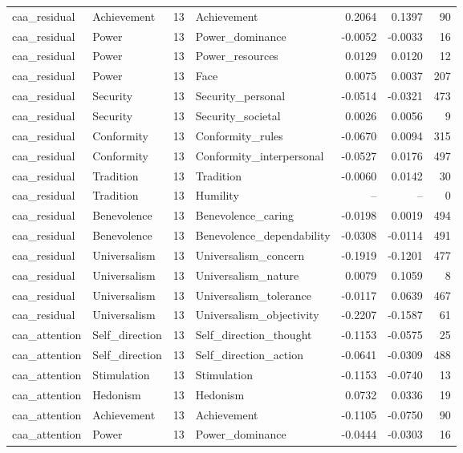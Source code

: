 \begin{tabular}{llrlrrr}
caa\_residual & Achievement & 13 & Achievement & 0.2064 & 0.1397 & 90 \\
caa\_residual & Power & 13 & Power\_dominance & -0.0052 & -0.0033 & 16 \\
caa\_residual & Power & 13 & Power\_resources & 0.0129 & 0.0120 & 12 \\
caa\_residual & Power & 13 & Face & 0.0075 & 0.0037 & 207 \\
caa\_residual & Security & 13 & Security\_personal & -0.0514 & -0.0321 & 473 \\
caa\_residual & Security & 13 & Security\_societal & 0.0026 & 0.0056 & 9 \\
caa\_residual & Conformity & 13 & Conformity\_rules & -0.0670 & 0.0094 & 315 \\
caa\_residual & Conformity & 13 & Conformity\_interpersonal & -0.0527 & 0.0176 & 497 \\
caa\_residual & Tradition & 13 & Tradition & -0.0060 & 0.0142 & 30 \\
caa\_residual & Tradition & 13 & Humility & -- & -- & 0 \\
caa\_residual & Benevolence & 13 & Benevolence\_caring & -0.0198 & 0.0019 & 494 \\
caa\_residual & Benevolence & 13 & Benevolence\_dependability & -0.0308 & -0.0114 & 491 \\
caa\_residual & Universalism & 13 & Universalism\_concern & -0.1919 & -0.1201 & 477 \\
caa\_residual & Universalism & 13 & Universalism\_nature & 0.0079 & 0.1059 & 8 \\
caa\_residual & Universalism & 13 & Universalism\_tolerance & -0.0117 & 0.0639 & 467 \\
caa\_residual & Universalism & 13 & Universalism\_objectivity & -0.2207 & -0.1587 & 61 \\
caa\_attention & Self\_direction & 13 & Self\_direction\_thought & -0.1153 & -0.0575 & 25 \\
caa\_attention & Self\_direction & 13 & Self\_direction\_action & -0.0641 & -0.0309 & 488 \\
caa\_attention & Stimulation & 13 & Stimulation & -0.1153 & -0.0740 & 13 \\
caa\_attention & Hedonism & 13 & Hedonism & 0.0732 & 0.0336 & 19 \\
caa\_attention & Achievement & 13 & Achievement & -0.1105 & -0.0750 & 90 \\
caa\_attention & Power & 13 & Power\_dominance & -0.0444 & -0.0303 & 16 \\

\end{tabular}
